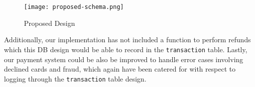 \begin{figure}[!hbt]
  \centering
 	\texttt{[image: proposed-schema.png]}
  \caption{Proposed Design}
 	\label{fig:proposed-schema}
\end{figure}

Additionally, our implementation has not included a function to perform refunds which this DB design would be able to record in the \texttt{transaction} table. Lastly, our payment system could be also be improved to handle error cases involving declined cards and fraud, which again have been catered for with respect to logging through the \texttt{transaction} table design.
